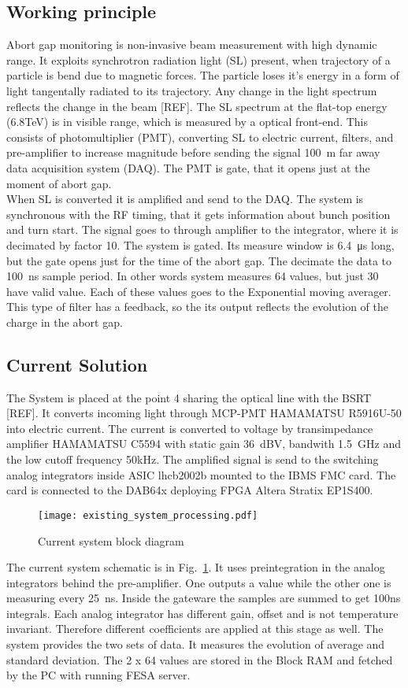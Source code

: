 \subsection{Working principle}
Abort gap monitoring is non-invasive beam measurement with high dynamic range.
It exploits synchrotron radiation light (SL) present, when trajectory of a
particle is bend due to magnetic forces. The particle loses it's energy in a
form of light tangentally radiated to its trajectory. Any change in the light
spectrum reflects the change in the beam [REF]. 
The SL spectrum at the flat-top energy (6.8TeV) is in visible range, which
is measured by a optical front-end. This consists of photomultiplier (PMT),
converting SL to electric current, filters, and pre-amplifier to increase
magnitude before sending the signal \SI{100}{m} far away data acquisition
system (DAQ). The PMT is gate, that it opens just at the moment of abort gap.
\\
When SL is converted it is amplified and send to the DAQ. The system is
synchronous with the RF timing, that it gets information about bunch position
and turn start. The signal goes to through amplifier to the integrator, where
it is decimated by factor 10. The system is gated. Its measure window is
\SI{6.4}{\micro\second} long, but the gate opens just for the time of the abort
gap. The decimate the data to \SI{100}{ns} sample period. In other words system
measures 64 values, but just 30 have valid value. Each of these values goes to
the Exponential moving averager. This type of filter has a feedback, so the
its output reflects the evolution of the charge in the abort gap. 

\subsection{Current Solution}
The System is placed at the point 4 sharing the optical line with the BSRT
[REF]. It converts incoming light through MCP-PMT HAMAMATSU R5916U-50 into
electric current. The current is converted to voltage by transimpedance
amplifier HAMAMATSU C5594 with static gain \SI{36}{dBV}, bandwith \SI{1.5}{GHz}
and the low cutoff frequency 50kHz.
The amplified signal is send to the switching analog integrators inside ASIC
lhcb2002b mounted to the IBMS FMC card. The card is connected to the DAB64x
deploying FPGA Altera Stratix EP1S400. 
\begin{figure}[!tbh]
    \centering
    \texttt{[image: existing\_system\_processing.pdf]}
    \caption{Current system block diagram}
    \label{fig:current_system_processing}
\end{figure}
The current system schematic is in Fig.~\ref{fig:current_system_processing}. It
uses preintegration in the analog integrators behind the pre-amplifier. One
outputs a value while the other one is measuring every \SI{25}{ns}. Inside the
gateware the samples are summed to get 100ns integrals. Each analog integrator
has different gain, offset and is not temperature invariant. Therefore
different coefficients are applied at this stage as well. 
The system provides the two sets of data. It measures the evolution of average
and standard deviation. The 2 x 64 values are stored in the Block RAM and
fetched by the PC with running FESA server.

